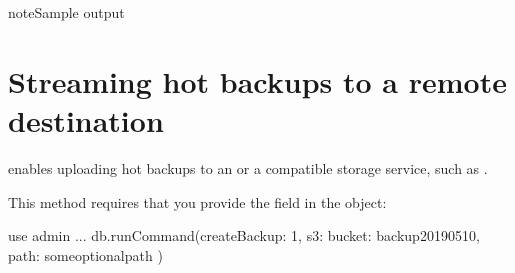 \documentclass[letterpaper,10pt,english]{sphinxmanual}
\begin{document}
\begin{sphinxadmonition}{note}{Sample output}
\begin{sphinxVerbatim}[commandchars=\\\{\}]



\end{sphinxVerbatim}
\end{sphinxadmonition}


\section{Streaming hot backups to a remote destination}
\label{\detokenize{hot-backup:streaming-hot-backups-to-a-remote-destination}}\label{\detokenize{hot-backup:psmdb-hot-backup-remote-destination}}
\sphinxAtStartPar
{} enables uploading hot backups to an  or a compatible storage service, such
as .

\sphinxAtStartPar
This method requires that you provide the  field in the  object:

\begin{sphinxVerbatim}[commandchars=\\\{\}]
\PYGZgt{} use admin
...
\PYGZgt{} db.runCommand(\PYGZob{}createBackup: 1, s3: \PYGZob{}bucket: \PYGZdq{}backup20190510\PYGZdq{}, path: \PYGZlt{}some\PYGZus{}optional\PYGZus{}path\PYGZgt{}\PYGZcb{} \PYGZcb{})
\end{sphinxVerbatim}
\end{document}
